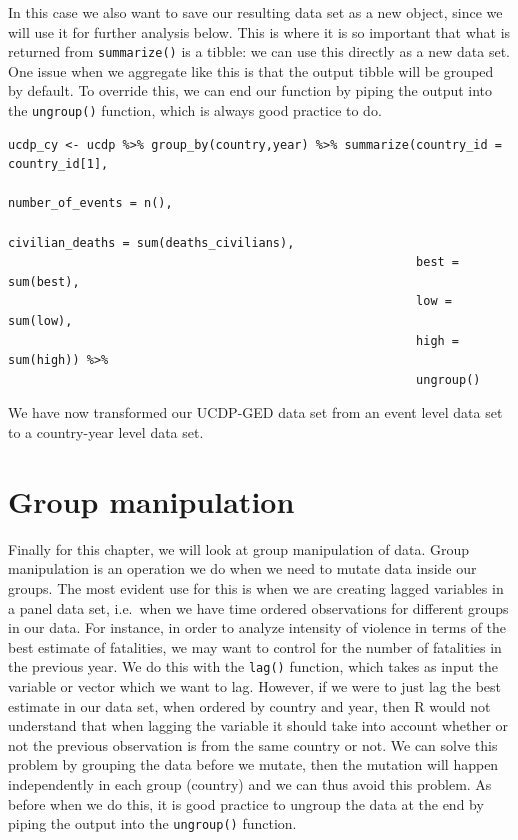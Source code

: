 \documentclass[
]{book}
\begin{document}
In this case we also want to save our resulting data set as a new object, since we will use it for further analysis below. This is where it is so important that what is returned from \texttt{summarize()} is a tibble: we can use this directly as a new data set. One issue when we aggregate like this is that the output tibble will be grouped by default. To override this, we can end our function by piping the output into the \texttt{ungroup()} function, which is always good practice to do.

\begin{verbatim}
ucdp_cy <- ucdp %>% group_by(country,year) %>% summarize(country_id = country_id[1],
                                                         number_of_events = n(),
                                                         civilian_deaths = sum(deaths_civilians),
                                                         best = sum(best),
                                                         low = sum(low),
                                                         high = sum(high)) %>%
                                                         ungroup()
\end{verbatim}

We have now transformed our UCDP-GED data set from an event level data set to a country-year level data set.

\hypertarget{group-manipulation}{%
\section{Group manipulation}\label{group-manipulation}}

Finally for this chapter, we will look at group manipulation of data. Group manipulation is an operation we do when we need to mutate data inside our groups. The most evident use for this is when we are creating lagged variables in a panel data set, i.e.~when we have time ordered observations for different groups in our data. For instance, in order to analyze intensity of violence in terms of the best estimate of fatalities, we may want to control for the number of fatalities in the previous year. We do this with the \texttt{lag()} function, which takes as input the variable or vector which we want to lag. However, if we were to just lag the best estimate in our data set, when ordered by country and year, then R would not understand that when lagging the variable it should take into account whether or not the previous observation is from the same country or not. We can solve this problem by grouping the data before we mutate, then the mutation will happen independently in each group (country) and we can thus avoid this problem. As before when we do this, it is good practice to ungroup the data at the end by piping the output into the \texttt{ungroup()} function.
\end{document}
